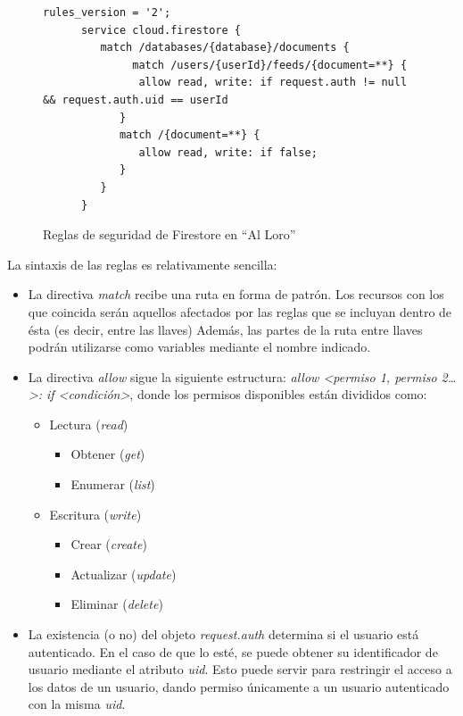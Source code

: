 \documentclass[11pt,spanish,listoffigures,listoftables,table,hyphens,dvipsnames]{tfgetsinf}
\begin{document}
\begin{figure}[ht]
   \centering
   \begin{lstlisting}[language=Firestore,columns=flexible]
      rules_version = '2';
      service cloud.firestore {
         match /databases/{database}/documents {
     	      match /users/{userId}/feeds/{document=**} {
               allow read, write: if request.auth != null && request.auth.uid == userId
            }
            match /{document=**} {
               allow read, write: if false;
            }
         }
      }
   \end{lstlisting}
   \caption{Reglas de seguridad de Firestore en ``Al Loro''}
   \label{figura:firestore-reglas-seguridad}
\end{figure}

La sintaxis de las reglas es relativamente sencilla:

\begin{itemize}
   \item La directiva \emph{match} recibe una ruta en forma de patrón. Los recursos con los que coincida serán aquellos afectados por las reglas que se incluyan dentro de ésta (es decir, entre las llaves) Además, las partes de la ruta entre llaves podrán utilizarse como variables mediante el nombre indicado.
   \item La directiva \emph{allow} sigue la siguiente estructura: \emph{allow <permiso 1, permiso 2\dots>: if <condición>}, donde los permisos disponibles están divididos como:
   \begin{itemize}
      \item Lectura (\emph{read})
      \begin{itemize}
         \item Obtener (\emph{get})
         \item Enumerar (\emph{list})
      \end{itemize}
      \item Escritura (\emph{write})
      \begin{itemize}
         \item Crear (\emph{create})
         \item Actualizar (\emph{update})
         \item Eliminar (\emph{delete})
      \end{itemize}
   \end{itemize}
   \item La existencia (o no) del objeto \emph{request.auth} determina si el usuario está autenticado. En el caso de que lo esté, se puede obtener su identificador de usuario mediante el atributo \emph{uid}. Esto puede servir para restringir el acceso a los datos de un usuario, dando permiso únicamente a un usuario autenticado con la misma \emph{uid}.
\end{itemize}
\end{document}
